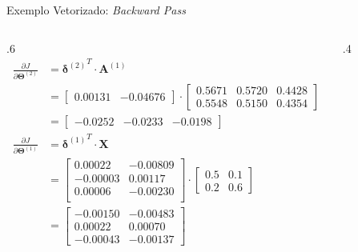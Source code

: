 \documentclass[aspectratio=169, xcolor=dvipsnames]{beamer}
\begin{document}
 \begin{frame}{Exemplo Vetorizado: \textit{Backward Pass}}
    \begin{columns}
        \begin{column}{.6\linewidth}
        \footnotesize
        \begin{align*}
              \frac{\partial J}{\partial \mathbf{\Theta}^{(2)}}&={\bm{\delta}^{(2)}}^{T}\cdot \mathbf{A}^{(1)}\\
              &=
      \begin{bmatrix}
        0.00131 & -0.04676
      \end{bmatrix}
      \cdot
      \begin{bmatrix}
        0.5671 & 0.5720 & 0.4428 \\
        0.5548 & 0.5150 & 0.4354
      \end{bmatrix}\\
            &=
      \begin{bmatrix}
        -0.0252 & -0.0233 & -0.0198
      \end{bmatrix}\\
      \frac{\partial J}{\partial \mathbf{\Theta}^{(1)}}&={\bm{\delta}^{(1)}}^{T}\cdot \mathbf{X} \\
            &=
      \begin{bmatrix}
        0.00022 & -0.00809 \\
        -0.00003 & 0.00117 \\
        0.00006 & -0.00230 \\
      \end{bmatrix}\cdot \begin{bmatrix}
                0.5 & 0.1 \\
                0.2 & 0.6
              \end{bmatrix}\\
      &=
      \begin{bmatrix}
        -0.00150 & -0.00483 \\
        0.00022  & 0.00070  \\
        -0.00043 & -0.00137
      \end{bmatrix}
        \end{align*}                
        \end{column}
        \begin{column}{.4\textwidth}
            \begin{figure}
                \centering
                \resizebox{\linewidth}{!}{
                }
            \end{figure}
        \end{column}    
    \end{columns}

\end{frame}
\end{document}
